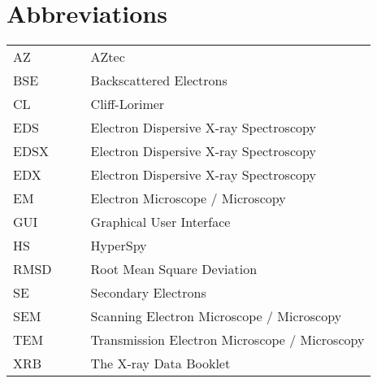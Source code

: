 \chapter*{Abbreviations}

\begin{table}[h!]
    \centering
    \begin{tabular}{llll}
        AZ   &  &  & AZtec                                         \\
        BSE  &  &  & Backscattered Electrons                       \\
        CL   &  &  & Cliff-Lorimer                                 \\
        EDS  &  &  & Electron Dispersive X-ray Spectroscopy        \\
        EDSX &  &  & Electron Dispersive X-ray Spectroscopy        \\
        EDX  &  &  & Electron Dispersive X-ray Spectroscopy        \\
        EM   &  &  & Electron Microscope / Microscopy              \\
        GUI  &  &  & Graphical User Interface                      \\
        HS   &  &  & HyperSpy                                      \\
        RMSD &  &  & Root Mean Square Deviation                    \\
        SE   &  &  & Secondary Electrons                           \\
        SEM  &  &  & Scanning Electron Microscope / Microscopy     \\
        TEM  &  &  & Transmission Electron Microscope / Microscopy \\
        XRB  &  &  & The X-ray Data Booklet
    \end{tabular}
\end{table}

